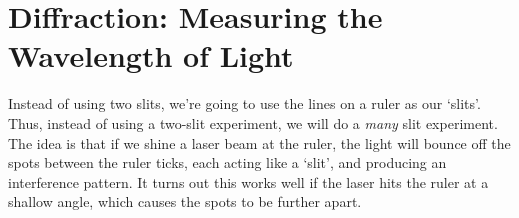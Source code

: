 \documentclass[12pt, letterpaper]{article}
\begin{document}
%
%
%
%
%
%
%
%
%



\section{Diffraction: Measuring the Wavelength of Light}

Instead of using two slits, we're going to use the lines on a ruler as our `slits'.
Thus, instead of using a two-slit experiment, we will do a \emph{many} slit experiment.
The idea is that if we shine a laser beam at the ruler, the light will bounce off the spots between the ruler ticks, each acting like a `slit', and producing an interference pattern.
It turns out this works well if the laser hits the ruler at a shallow angle, which causes the spots to be further apart.
\end{document}
